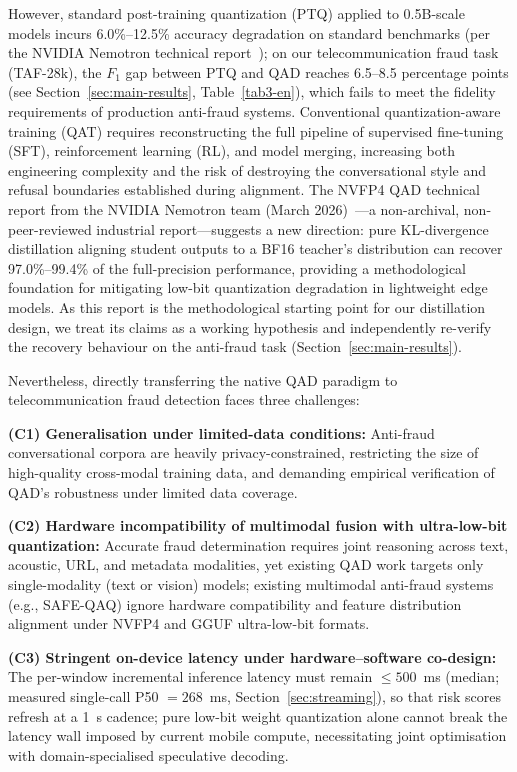 \documentclass[final,5p,times,number]{elsarticle}
\begin{document}
However, standard post-training quantization (PTQ) applied to 0.5B-scale models incurs 6.0\%--12.5\% accuracy degradation on standard benchmarks (per the NVIDIA Nemotron technical report~\cite{3}); on our telecommunication fraud task (TAF-28k), the $F_1$ gap between PTQ and QAD reaches 6.5--8.5 percentage points (see Section~\ref{sec:main-results}, Table~\ref{tab3-en}), which fails to meet the fidelity requirements of production anti-fraud systems. Conventional quantization-aware training (QAT) requires reconstructing the full pipeline of supervised fine-tuning (SFT), reinforcement learning (RL), and model merging, increasing both engineering complexity and the risk of destroying the conversational style and refusal boundaries established during alignment. The NVFP4 QAD technical report from the NVIDIA Nemotron team (March 2026)~\cite{3}---a non-archival, non-peer-reviewed industrial report---suggests a new direction: pure KL-divergence distillation aligning student outputs to a BF16 teacher's distribution can recover 97.0\%--99.4\% of the full-precision performance, providing a methodological foundation for mitigating low-bit quantization degradation in lightweight edge models. As this report is the methodological starting point for our distillation design, we treat its claims as a working hypothesis and independently re-verify the recovery behaviour on the anti-fraud task (Section~\ref{sec:main-results}).

Nevertheless, directly transferring the native QAD paradigm to telecommunication fraud detection faces three challenges:

\textbf{(C1) Generalisation under limited-data conditions:} Anti-fraud conversational corpora are heavily privacy-constrained, restricting the size of high-quality cross-modal training data, and demanding empirical verification of QAD's robustness under limited data coverage.

\textbf{(C2) Hardware incompatibility of multimodal fusion with ultra-low-bit quantization:} Accurate fraud determination requires joint reasoning across text, acoustic, URL, and metadata modalities, yet existing QAD work targets only single-modality (text or vision) models; existing multimodal anti-fraud systems (e.g., SAFE-QAQ) ignore hardware compatibility and feature distribution alignment under NVFP4 and GGUF ultra-low-bit formats.

\textbf{(C3) Stringent on-device latency under hardware--software co-design:} The per-window incremental inference latency must remain $\le 500$~ms (median; measured single-call P50 $=268$~ms, Section~\ref{sec:streaming}), so that risk scores refresh at a 1~s cadence; pure low-bit weight quantization alone cannot break the latency wall imposed by current mobile compute, necessitating joint optimisation with domain-specialised speculative decoding.
\end{document}
